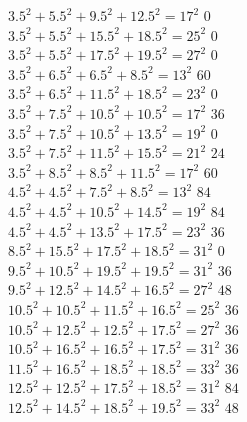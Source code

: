 \documentclass[12pt,table]{article}
\theoremstyle{definition}
\theoremstyle{remark}
\numberwithin{equation}{section}
\begin{document}
\begin{appendices}
{\begin{tabbing}
$3.5^2+ 5.5^2+ 9.5^2+ 12.5^2  = 17^2$ \>$0$\\
$3.5^2+ 5.5^2+ 15.5^2+ 18.5^2  = 25^2$ \>$0$\\
$3.5^2+ 5.5^2+ 17.5^2+ 19.5^2  = 27^2$ \>$0$\\
$3.5^2+ 6.5^2+ 6.5^2+ 8.5^2  = 13^2$ \>$60$\\
$3.5^2+ 6.5^2+ 11.5^2+ 18.5^2  = 23^2$ \>$0$\\
$3.5^2+ 7.5^2+ 10.5^2+ 10.5^2  = 17^2$ \>$36$\\
$3.5^2+ 7.5^2+ 10.5^2+ 13.5^2  = 19^2$ \>$0$\\
$3.5^2+ 7.5^2+ 11.5^2+ 15.5^2  = 21^2$ \>$24$\\
$3.5^2+ 8.5^2+ 8.5^2+ 11.5^2  = 17^2$ \>$60$\\
$4.5^2+ 4.5^2+ 7.5^2+ 8.5^2  = 13^2$ \>$84$\\
$4.5^2+ 4.5^2+ 10.5^2+ 14.5^2  = 19^2$ \>$84$\\
$4.5^2+ 4.5^2+ 13.5^2+ 17.5^2  = 23^2$ \>$36$\\
$8.5^2+ 15.5^2+ 17.5^2+ 18.5^2  = 31^2$ \>$0$\\
$9.5^2+ 10.5^2+ 19.5^2+ 19.5^2  = 31^2$ \>$36$\\
$9.5^2+ 12.5^2+ 14.5^2+ 16.5^2  = 27^2$ \>$48$\\
$10.5^2+ 10.5^2+ 11.5^2+ 16.5^2  = 25^2$ \>$36$\\
$10.5^2+ 12.5^2+ 12.5^2+ 17.5^2  = 27^2$ \>$36$\\
$10.5^2+ 16.5^2+ 16.5^2+ 17.5^2  = 31^2$ \>$36$\\
$11.5^2+ 16.5^2+ 18.5^2+ 18.5^2  = 33^2$ \>$36$\\
$12.5^2+ 12.5^2+ 17.5^2+ 18.5^2  = 31^2$ \>$84$\\
$12.5^2+ 14.5^2+ 18.5^2+ 19.5^2  = 33^2$ \>$48$\\
\end{tabbing}
}



\end{appendices}






\newcommand{\journal}[6]{{\sc #1,} #2, {\it #3} {\bf #4} (#5), #6.}
\newcommand{\preprint}[3]{{\sc #1,} #2, preprint #3.}
\newcommand{\book}[4]{{\sc #1,} #2, #3, #4.}
\newcommand{\collection}[6]{{\sc #1,}  #2, #3, in {\it #4}, #5, #6.}
\newcommand{\JCTA}{J.\ Combin.\ Theory Ser.\ A}
\newcommand{\arxiv}[3]{{\sc #1,} #2, {\tt #3}.}
\newcommand{\article}[3]{{\sc #1,} #2, {\tt #3}.}
\end{document}
